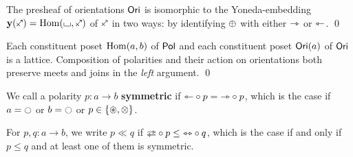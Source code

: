 \documentclass[a4paper]{memoir}
\begin{document}
\begin{corollary}
	The presheaf of orientations ${\mathsf{Ori}}$ is isomorphic to the Yoneda-embedding $\yoneda(\ypolar) = \Hom(\loch, \ypolar)$ of $\ypolar$ in two ways: by identifying ${\oplus}$ with either ${\rightarrowtriangle}$ or ${\leftarrowtriangle}$. \qed
\end{corollary}
\begin{corollary}
	Each constituent poset ${\mathrm{Hom}}(a, b)$ of ${\mathsf{Pol}}$ and each constituent poset ${\mathsf{Ori}}(a)$ of ${\mathsf{Ori}}$ is a lattice.
	Composition of polarities and their action on orientations both preserve meets and joins in the \emph{left} argument. \qed
\end{corollary}
\begin{definition}
	We call a polarity $p : a \to b$ \textbf{symmetric} if ${\leftarrowtriangle} \circ p = {\rightarrowtriangle} \circ p$, which is the case if $a = \npolar$ or $b = \npolar$ or $p \in \mathopen{}\left\{ {\oast}, {\otimes} \right\}\mathclose{}$.
	
	For $p, q : a \to b$, we write $p \ll q$ if $\infrajetsym \circ p \leq \equijetsym \circ q$, which is the case if and only if $p \leq q$ and at least one of them is symmetric.
\end{definition}
\end{document}
